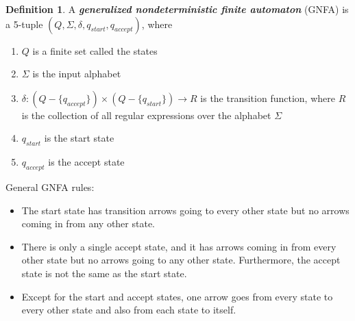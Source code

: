 \documentclass[11pt]{article}
\theoremstyle{definition}
\newtheorem{defn}{Definition}[section]
\begin{document}
\begin{defn}
A \textbf{\textit{generalized nondeterministic finite automaton}} (GNFA) is a 5-tuple $(Q,\Sigma, \delta, q_{start}, q_{accept})$, where
\begin{enumerate}
    \item $Q$ is a finite set called the states 
    \item $\Sigma$ is the input alphabet
    \item $\delta: (Q-\{q_{accept}\})\times(Q-\{q_{start}\}) \longrightarrow R$ is the transition function, where $R$ is the collection of all regular expressions over the alphabet $\Sigma$
    \item $q_{start}$ is the start state
    \item $q_{accept}$ is the accept state
\end{enumerate}

General GNFA rules:
\begin{itemize}
    \item The start state has transition arrows going to every other state but no arrows coming in from any other state.
    \item There is only a single accept state, and it has arrows coming in from every other state but no arrows going to any other state. Furthermore, the accept state is not the same as the start state.
    \item Except for the start and accept states, one arrow goes from every state to every other state and also from each state to itself.
\end{itemize}
\end{defn}
\end{document}
